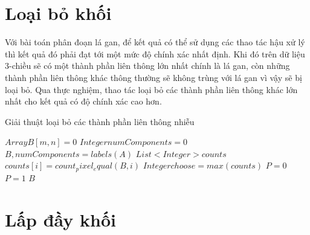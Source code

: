 \section{Loại bỏ khối}
Với bài toán phân đoạn lá gan, để kết quả có thể sử dụng các thao tác hậu xử lý thì kết quả đó phải đạt tới một mức độ chính xác nhất định. Khi đó trên dữ liệu 3-chiều sẽ có một thành phần liên thông lớn nhất chính là lá gan, còn những thành phần liên thông khác thông thường sẽ không trùng với lá gan vì vậy sẽ bị loại bỏ. Qua thực nghiệm, thao tác loại bỏ các thành phần liên thông khác lớn nhất cho kết quả có độ chính xác cao hơn.\\
\begin{algorithm}
  \caption{Giải thuật loại bỏ các thành phần liên thông nhiễu}\label{remove_components}
  \begin{algorithmic}[1]
    \State $Array B[m,n] = 0$
    \State $Integer numComponents = 0$
    \State $B, numComponents = labels(A)$ 
    \State $List<Integer> counts$
        \State $counts[i] = count_pixel_equal(B, i)$
    \EndFor
    \State $Integer choose = max(counts)$
            \State $P = 0$ 
        \Else
            \State $P = 1$
        \EndIf
    \EndFor
    \Return $B$
    \EndProcedure
  \end{algorithmic}
\end{algorithm}
\section{Lấp đầy khối}
